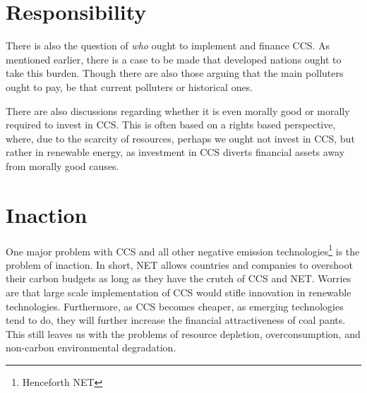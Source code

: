 \documentclass[12pt]{report}
\begin{document}
\section{Responsibility}

There is also the question of \emph{who} ought to implement and finance CCS. As
mentioned earlier, there is a case to be made that developed nations ought to
take this burden. Though there are also those arguing that the main polluters
ought to pay, be that current polluters or historical ones.

There are also discussions regarding whether it is even morally good or morally
required to invest in CCS. This is often based on a rights based perspective,
where, due to the scarcity of resources, perhaps we ought not invest in CCS, but
rather in renewable energy, as investment in CCS diverts financial assets away
from morally good causes.

\section{Inaction}

One major problem with CCS and all other negative emission
technologies\footnote{Henceforth NET} is the problem of inaction. In short, NET
allows countries and companies to overshoot their carbon budgets as long as they
have the crutch of CCS and NET. Worries are that large scale implementation of
CCS would stifle innovation in renewable technologies. Furthermore, as CCS
becomes cheaper, as emerging technologies tend to do, they will further increase
the financial attractiveness of coal pants. This still leaves us with the
problems of resource depletion, overconsumption, and non-carbon environmental
degradation.
\end{document}
